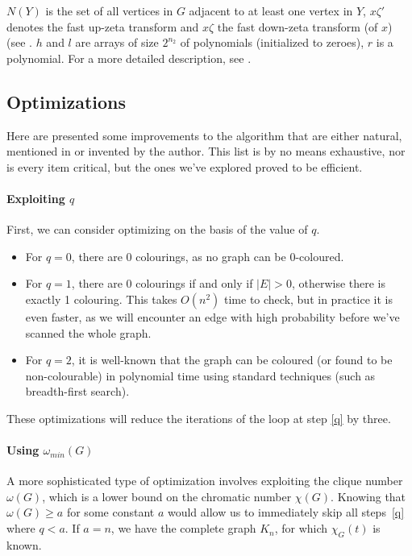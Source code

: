 \documentclass[a4paper]{article}
\begin{document}
$N(Y)$ is the set of all vertices in $G$ adjacent to at least one vertex in $Y$, $x\zeta'$ denotes the fast up-zeta transform and $x\zeta$ the fast down-zeta transform (of $x$) (see \cite[sec 2]{cov_pack}. $h$ and $l$ are arrays of size $2^{n_2}$ of polynomials (initialized to zeroes), $r$ is a polynomial. For a more detailed description, see \cite[p 9]{cov_pack}.

\subsection{Optimizations}\label{opts}
Here are presented some improvements to the algorithm that are either natural, mentioned in \cite{cov_pack} or invented by the author. This list is by no means exhaustive, nor is every item critical, but the ones we've explored proved to be efficient.

\paragraph{Exploiting $q$}
First, we can consider optimizing on the basis of the value of $q$.
\begin{itemize}
\item For $q = 0$, there are 0 colourings, as no graph can be 0-coloured.
\item For $q = 1$, there are 0 colourings if and only if $|E| > 0$, otherwise there is exactly 1 colouring. This takes $O(n^2)$ time to check, but in practice it is even faster, as we will encounter an edge with high probability before we've scanned the whole graph.
\item For $q = 2$, it is well-known that the graph can be coloured (or found to be non-colourable) in polynomial time using standard techniques (such as breadth-first search).
\end{itemize}

These optimizations will reduce the iterations of the loop at step \ref{q} by three.

\paragraph{Using $\omega_{min}(G)$}
A more sophisticated type of optimization involves exploiting the clique number $\omega(G)$, which is a lower bound on the chromatic number $\chi(G)$. Knowing that $\omega(G) \geq a$ for some constant $a$ would allow us to immediately skip all steps~\ref{q} where $q < a$. If $a = n$, we have the complete graph $K_n$, for which $\chi_G(t)$ is known.
\end{document}
